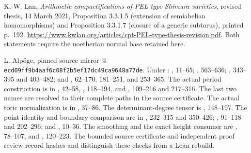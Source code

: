 K.-W. Lan, \emph{Arithmetic compactifications of PEL-type Shimura
varieties}, revised thesis, 14 March 2021, Proposition 3.3.1.5
(extension of semiabelian homomorphisms) and Proposition 3.3.1.7
(closure of a generic subtorus), printed p.~192.
\url{https://www.kwlan.org/articles/cpt-PEL-type-thesis-revision.pdf}.
Both statements require the noetherian normal base retained here.

L. Alp\"oge, pinned source mirror
@\allowbreak
\texttt{ecd09ff9b4aaf6c08f2b5ef17dc49ca9648a77de}.
Under :
, 11--65;
, 563--636;
,
343--395 and 403--482; and
,
62--170, 181--251, and 253--365.
The actual period construction is in
, 42--58,
, 118--194, and
, 109--216 and 217--316.
The last two names are resolved to their complete paths in the
source certificate. The actual toric normalization is in
, 37--86.
The determinant-degree tensor is
, 148--197.
The point identity and boundary comparison are in
,
232--315 and 350--426;
, 91--118 and 202--296;
and , 10--36.
The smoothing and the exact height consumer are
,
78--107, and
, 120--223.
The bounded source certificate and independent proof review
record hashes and distinguish these checks from a Lean rebuild.
